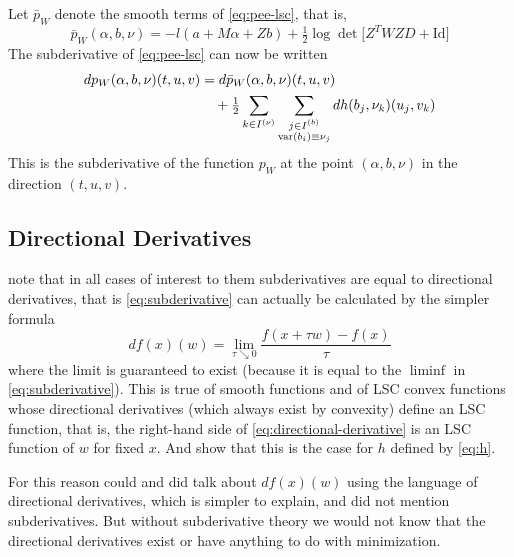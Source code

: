 Let $\bar{p}_W$ denote the smooth terms of \eqref{eq:pee-lsc}, that is,
\begin{equation} \label{eq:pee-bar}
   \bar{p}_W(\alpha, b, \nu)
   =
   - l(a + M \alpha + Z b)
   + \tfrac{1}{2} \log \det \bigl[ Z^T W Z D + \text{Id} \bigr]
\end{equation}
The subderivative of \eqref{eq:pee-lsc} can now be written
\begin{equation} \label{eq:pee-lsc-subderivative}
\begin{split}
   d p_W(\alpha, b, \nu)(t, u, v)
   & =
   d \bar{p}_W(\alpha, b, \nu)(t, u, v)
   \\
   & \quad
   + \tfrac{1}{2}
   \sum_{k \in I^{(\nu)}}
   \sum_{\substack{j \in I^{(b)} \\ \operatorname{var}(b_i) \equiv \nu_j}}
   d h(b_j, \nu_k)(u_j, v_k)
\end{split}
\end{equation}
This is the subderivative of the function $p_W$ at the point $(\alpha, b, \nu)$
in the direction $(t, u, v)$.

\subsection{Directional Derivatives}

\citet{reaster-tr} note that in all cases of interest to them
subderivatives are equal to directional derivatives,
that is \eqref{eq:subderivative} can actually be calculated by the simpler
formula
\begin{equation} \label{eq:directional-derivative}
   d f(x)(w) = \lim_{\tau \searrow 0}
   \frac{f(x + \tau w) - f(x)}{\tau}
\end{equation}
where the limit is guaranteed to exist (because it is equal to the $\liminf$
in \eqref{eq:subderivative}).
This is true of smooth functions and of LSC convex functions whose directional
derivatives (which always exist by convexity) define an LSC function,
that is, the right-hand side of \eqref{eq:directional-derivative} is
an LSC function of $w$ for fixed $x$.  And \citet[Section~1.10.3]{reaster-tr}
show that this is the case for $h$ defined by \eqref{eq:h}.

For this reason \citet{reaster} could and did talk about $d f(x)(w)$ using
the language of directional derivatives, which is simpler to explain, and
did not mention subderivatives.  But without subderivative theory
\citep[Chapters~8 and~10]{rockafellar-wets} we would not know that the
directional derivatives exist or have anything to do with minimization.

